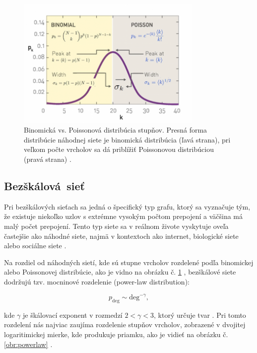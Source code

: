 \begin{figure}
    \centerline{\includegraphics[width=0.8\textwidth]{images/randomdegdist.png}}
    \caption[Binomická vs. Poissonová distribúcia stupňov.]{Binomická vs. Poissonová distribúcia stupňov.
    Presná forma distribúcie náhodnej siete je binomická distribúcia (ľavá strana), pri veľkom počte vrcholov sa
    dá priblížiť Poissonovou distribúciou (pravá strana) \cite{barabasi2016network} .}
    \label{obr:randomdegdist}
\end{figure}

\subsection{Bezškálová~sieť}\label{sec:scale-free-network}

Pri bezškálových sieťach sa jedná o špecifický typ grafu, ktorý sa vyznačuje tým, že existuje niekoľko uzlov
s extrémne vysokým počtom prepojení a väčšina má malý počet prepojení. Tento typ siete sa
v reálnom živote vyskytuje oveľa častejšie ako náhodné siete, najmä v kontextoch ako internet,
biologické siete alebo sociálne siete \cite{barabasi1999emergence} \cite{barabasi2016network} .

Na rozdiel od náhodných sietí, kde sú stupne vrcholov rozdelené podľa binomickej alebo Poissonovej distribúcie, ako je vidno na obrázku č. \ref{obr:randomdegdist} ,
bezškálové siete dodržujú tzv. mocninové rozdelenie (power-law distribution):

\begin{equation}
    p_{\mathrm{deg}} \sim \mathrm{deg}^{-\gamma},
    \label{eq:power_law_distribution_scale_free}
\end{equation}

kde $\gamma$ je škálovací exponent v rozmedzí $2 < \gamma < 3$, ktorý určuje tvar \cite{barabasi2016network} . Pri tomto rozdelení nás najviac zaujíma
rozdelenie stupňov vrcholov, zobrazené v dvojitej logaritimickej mierke, kde produkuje priamku, ako je vidieť na obrázku č. \ref{obr:powerlaw} .

